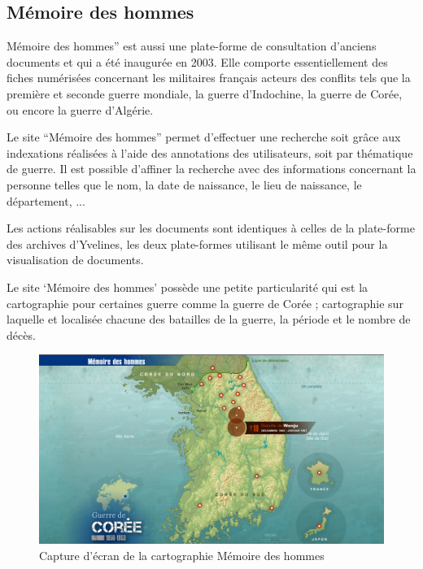         \subsection{Mémoire des hommes}
        \label{subsec:memoire}
        Mémoire des hommes” est aussi une plate-forme de consultation d’anciens documents
        et qui a été inaugurée en 2003. Elle comporte essentiellement des fiches numérisées concernant
        les militaires français acteurs des conflits tels que la première et seconde guerre mondiale,
        la guerre d’Indochine, la guerre de Corée, ou encore la guerre d’Algérie.

        Le site “Mémoire des hommes” permet d’effectuer une recherche soit grâce aux indexations
        réalisées à l’aide des annotations des utilisateurs, soit par thématique de guerre.
        Il est possible d’affiner la recherche avec des informations concernant la personne telles que le nom,
        la date de naissance, le lieu de naissance, le département, ...

        Les actions réalisables sur les documents sont identiques à celles de la plate-forme
        des archives d’Yvelines, les deux plate-formes utilisant le même outil pour la visualisation
        de documents.

        Le site ‘Mémoire des hommes’ possède une petite particularité qui est la cartographie pour
        certaines guerre comme la guerre de Corée ; cartographie sur laquelle et localisée chacune
        des batailles de la guerre, la période et le nombre de décès.

        \begin{figure}[ht!]
            \centering
            \includegraphics[width=1\textwidth]{figure/screen_memoire_hommes.png}
            \caption{Capture d'écran de la cartographie Mémoire des hommes}
            \label{fig:memoire_hommes}
        \end{figure}

